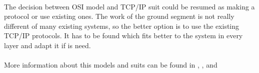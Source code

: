 \paragraph{}
The decision between OSI model and TCP/IP suit could be resumed as making a protocol or use existing ones. The work of the ground segment is not really different of many existing systems, so the better option is to use the existing TCP/IP protocols. It has to be found which fits better to the system in every layer and adapt it if is need.
\paragraph{}
More information about this models and suits can be found in \cite{OSI}, \cite{TCPIP}, \cite{NetBEUI} and \cite{IPX}
